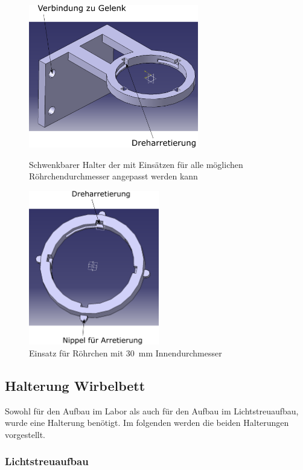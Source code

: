 	\begin{figure}[h]
		\begin{minipage}[hbt]{7.4cm}
			\centering
			\includegraphics[width=7.4cm]{Basishalter.png}
			\caption{Schwenkbarer Halter der mit Einsätzen für alle möglichen Röhrchendurchmesser angepasst werden kann}
		\end{minipage}
		\hfill
		\begin{minipage}[hbt]{5.7cm}
			\centering
			\includegraphics[width=5.7cm]{Basishalter_Einsatz.png}
			\caption{Einsatz für Röhrchen mit \SI{30}{mm} Innendurchmesser}
		\end{minipage}
	\end{figure}


\subsection{Halterung Wirbelbett}

Sowohl für den Aufbau im Labor als auch für den Aufbau im Lichtstreuaufbau, wurde eine Halterung benötigt. Im folgenden werden die beiden Halterungen vorgestellt.

\subsubsection{Lichtstreuaufbau}


